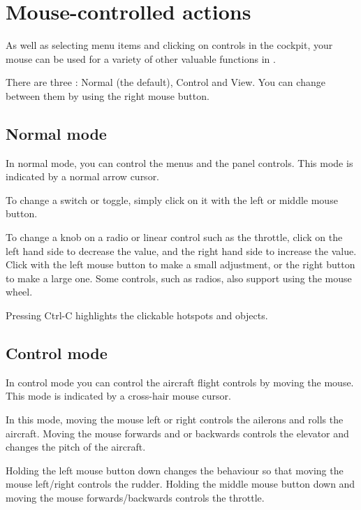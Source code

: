 \section{Mouse-controlled actions}

As well as selecting menu items and clicking on controls in the cockpit, your
mouse can be used for a variety of other valuable functions in \FlightGear{}.

There are three : Normal (the default), Control and View. You can
change between them by using the right mouse button.

\subsection{Normal mode}

In normal mode, you can control the menus and the panel controls. This mode is indicated by
a normal arrow cursor.

To change a switch or toggle, simply click on it with the left or middle mouse button.

To change a knob on a radio or linear control such as the throttle, click on the left
hand side to decrease the value, and the right hand side to increase the value. Click
with the left mouse button to make a small adjustment, or the right button to make a
large one. Some controls, such as radios, also support using the mouse wheel.

Pressing Ctrl-C highlights the clickable hotspots and objects.

\subsection{Control mode}

In control mode you can control the aircraft flight controls by moving the mouse.
This mode is indicated by a cross-hair mouse cursor.

In this mode, moving the mouse left or right controls the ailerons and rolls the
aircraft. Moving the mouse forwards and or backwards controls the elevator and
changes the pitch of the aircraft.

Holding the left mouse button down changes the behaviour so that moving the
mouse left/right controls the rudder. Holding the middle mouse button down and
moving the mouse forwards/backwards controls the throttle.

